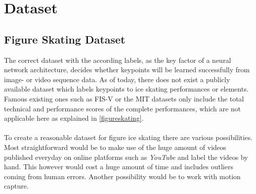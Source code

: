 

\chapter{Dataset} %

\label{dataset} %



\section{Figure Skating Dataset}

The correct dataset with the according labels, as the key factor of a neural network architecture, decides whether keypoints
will be learned successfully from image- or video sequence data.
As of today, there does not exist a publicly available dataset which labels keypoints to ice skating performances or
elements.
Famous existing ones such as FIS-V or the MIT datasets only include the total technical and performance scores of the
complete performances, which are not applicable here as explained in \autoref{figureskating}.
\\\mbox{}\\
To create a reasonable dataset for figure ice skating there are various possibilities.
Most straightforward would be to make use of the huge amount of videos published everyday on online platforms such as
\textit{YouTube} and label the videos by hand. This however would cost a huge amount of time and includes outliers coming from
human errors.
Another possibility would be to work with motion capture.
\\\mbox{}\\


